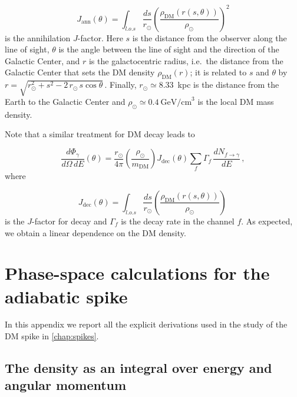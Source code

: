 \begin{equation}
    J_{\mathrm{ann}} (\theta) = \int_{l.o.s} \frac{ds}{r_\odot} \left( \frac{\rho_{\mathrm{DM}}(r(s, \theta))}{\rho_\odot} \right)^2
\end{equation}
is the annihilation $J$-factor. 
Here $s$ is the distance from the observer along the line of sight, $\theta$ is the angle between the line of sight and the direction of the Galactic Center, and $r$ is the galactocentric radius, i.e.\ the distance from the Galactic Center that sets the DM density $\rho_{\mathrm{DM}}(r)$;
it is related to $s$ and $\theta$ by $r = \sqrt{r_\odot^{2} + s^{2} - 2\,r_\odot\, s \cos\theta}\,$. Finally, $r_\odot \simeq 8.33$~kpc is the distance from the Earth to the Galactic Center and $\rho_\odot \simeq 0.4~\text{GeV/cm}^3$ is the local DM mass density.

Note that a similar treatment for DM decay leads to

\begin{equation} \label{Decay}
\frac{d\Phi_\gamma}{d\Omega\, dE} (\theta)
=
\frac{r_\odot}{4\pi}
\left(\frac{\rho_\odot}{m_{\mathrm{DM}}}\right)
J_{\mathrm{dec}}(\theta)
\sum_{f}\Gamma_f\,
\frac{dN_{f\to\gamma}}{dE}\,,
\end{equation}
where

\begin{equation} 
J_{\mathrm{dec}} (\theta)
=
\int_{l.o.s} \frac{ds}{r_\odot}
\left(\frac{\rho_{\mathrm{DM}}(r(s, \theta))}{\rho_\odot}\right)\,
\label{eq:Jdec}
\end{equation}
is the $J$-factor for decay and $\Gamma_f$ is the decay rate in the channel $f$. As expected, we obtain a linear dependence on the DM density.










\chapter{Phase-space calculations for the adiabatic spike}
\label{app:spike}

In this appendix we report all the explicit derivations used in the study of the DM spike in \cref{chap:spikes}.

\section{The density as an integral over energy and angular momentum}
\label{app:densityEL}

